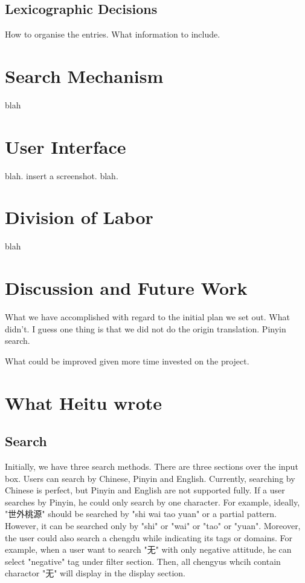 \documentclass[11pt]{article} %
\begin{document}
\subsection{Lexicographic Decisions}

\indent How to organise the entries. What information to include. \\

\section{Search Mechanism}

\indent blah\\

\section{User Interface}

\indent blah. insert a screenshot. blah.\\

\section{Division of Labor}

\indent blah\\

\section{Discussion and Future Work}
\indent What we have accomplished with regard to the initial plan we set out. What didn't. I guess one thing is that we did not do the origin translation. Pinyin search.

\indent What could be improved given more time invested on the project. 

\section{What Heitu wrote}
\subsection{Search}
\indent Initially, we have three search methods. There are three sections over the input box. Users can search by Chinese, Pinyin and English. Currently, searching by Chinese is perfect, but Pinyin and English are not supported fully. If a user searches by Pinyin, he could only search by one character. For example, ideally, "世外桃源" should be searched by "shi wai tao yuan" or a partial pattern. However, it can be searched only by "shi" or "wai" or "tao" or "yuan". Moreover, the user could also search a chengdu while indicating its tags or domains. For example, when a user want to search "无" with only negative attitude, he can select "negative" tag under filter section. Then, all chengyus whcih contain charactor "无" will display in the display section. 
\end{document}
